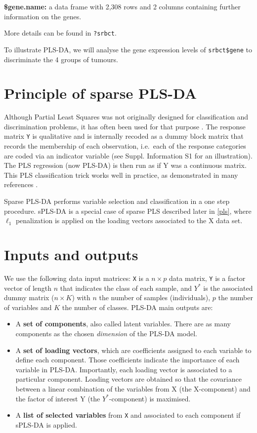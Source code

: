 \documentclass[]{book}
\theoremstyle{definition}
\theoremstyle{definition}
\theoremstyle{definition}
\theoremstyle{remark}
\begin{document}
\textbf{\$gene.name:} a data frame with 2,308 rows and 2 columns
containing further information on the genes.

More details can be found in \texttt{?srbct}.

To illustrate PLS-DA, we will analyse the gene expression levels of
\texttt{srbct\$gene} to discriminate the 4 groups of tumours.

\section{Principle of sparse PLS-DA}\label{principle-of-sparse-pls-da}

Although Partial Least Squares was not originally designed for
classification and discrimination problems, it has often been used for
that purpose \citep{Ngu02a, Tan04}. The response matrix \texttt{Y} is
qualitative and is internally recoded as a dummy block matrix that
records the membership of each observation, i.e.~each of the response
categories are coded via an indicator variable (see \citep{mixomics}
Suppl. Information S1 for an illustration). The PLS regression (now
PLS-DA) is then run as if Y was a continuous matrix. This PLS
classification trick works well in practice, as demonstrated in many
references \citep{Bar03, Ngu02a, Bou07, Chung10}.

Sparse PLS-DA \citep{Lec11} performs variable selection and
classification in a one step procedure. sPLS-DA is a special case of
sparse PLS described later in \ref{pls}, where \(\ell_1\) penalization
is applied on the loading vectors associated to the X data set.

\section{Inputs and outputs}\label{inputs-and-outputs}

We use the following data input matrices: \texttt{X} is a \(n \times p\)
data matrix, \texttt{Y} is a factor vector of length \(n\) that
indicates the class of each sample, and \(Y^*\) is the associated dummy
matrix (\(n \times K\)) with \(n\) the number of samples (individuals),
\(p\) the number of variables and \(K\) the number of classes. PLS-DA
main outputs are:

\begin{itemize}
\item
  A \textbf{set of components}, also called latent variables. There are
  as many components as the chosen \emph{dimension} of the PLS-DA model.
\item
  A \textbf{set of loading vectors}, which are coefficients assigned to
  each variable to define each component. Those coefficients indicate
  the importance of each variable in PLS-DA. Importantly, each loading
  vector is associated to a particular component. Loading vectors are
  obtained so that the covariance between a linear combination of the
  variables from X (the X-component) and the factor of interest Y (the
  \(Y^*\)-component) is maximised.
\item
  A \textbf{list of selected variables} from \texttt{X} and associated
  to each component if sPLS-DA is applied.
\end{itemize}
\end{document}
